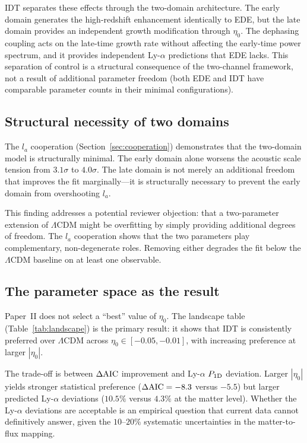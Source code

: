 \documentclass[aps,prd,twocolumn,superscriptaddress,nofootinbib]{revtex4-2}
\newcommand{\dAIC}{\Delta{\rm AIC}}
\begin{document}
IDT separates these effects through the two-domain architecture. The
early domain generates the high-redshift enhancement identically to
EDE, but the late domain provides an independent growth modification
through $\eta_0$. The dephasing coupling acts on the late-time growth
rate without affecting the early-time power spectrum, and it provides
independent Ly-$\alpha$ predictions that EDE lacks. This separation
of control is a structural consequence of the two-channel framework,
not a result of additional parameter freedom (both EDE and IDT have
comparable parameter counts in their minimal configurations).

\subsection{Structural necessity of two domains}
\label{sec:necessity}

The $l_a$ cooperation (Section~\ref{sec:cooperation}) demonstrates
that the two-domain model is structurally minimal. The early domain
alone worsens the acoustic scale tension from $3.1\sigma$ to
$4.0\sigma$. The late domain is not merely an additional freedom
that improves the fit marginally---it is structurally necessary to
prevent the early domain from overshooting $l_a$.

This finding addresses a potential reviewer objection: that a
two-parameter extension of $\Lambda$CDM might be overfitting by
simply providing additional degrees of freedom. The $l_a$
cooperation shows that the two parameters play complementary,
non-degenerate roles. Removing either degrades the fit below the
$\Lambda$CDM baseline on at least one observable.

\subsection{The parameter space as the result}
\label{sec:space_as_result}

Paper~II does not select a ``best'' value of $\eta_0$. The landscape
table (Table~\ref{tab:landscape}) is the primary result: it shows
that IDT is consistently preferred over $\Lambda$CDM across
$\eta_0 \in [-0.05, -0.01]$, with increasing preference at larger
$|\eta_0|$.

The trade-off is between $\dAIC$ improvement and Ly-$\alpha$
$P_{1{\rm D}}$ deviation. Larger $|\eta_0|$ yields stronger
statistical preference ($\dAIC = -8.3$ versus $-5.5$) but larger
predicted Ly-$\alpha$ deviations ($10.5\%$ versus $4.3\%$ at the
matter level). Whether the Ly-$\alpha$ deviations are acceptable is
an empirical question that current data cannot definitively answer,
given the $10$--$20\%$ systematic uncertainties in the matter-to-flux
mapping.
\end{document}
